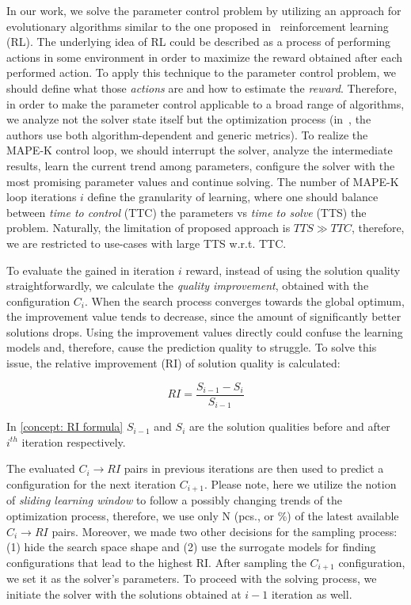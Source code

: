 In our work, we solve the parameter control problem by utilizing an approach for evolutionary algorithms similar to the one proposed in~\cite{karafotias2014generic} reinforcement learning (RL). The underlying idea of RL could be described as a process of performing actions in some environment in order to maximize the reward obtained after each performed action. To apply this technique to the parameter control problem, we should define what those \emph{actions} are and how to estimate the \emph{reward}. Therefore, in order to make the parameter control applicable to a broad range of algorithms, we analyze not the solver state itself but the optimization process (in~\cite{karafotias2014generic}, the authors use both algorithm-dependent and generic metrics). To realize the MAPE-K control loop, we should interrupt the solver, analyze the intermediate results, learn the current trend among parameters, configure the solver with the most promising parameter values and continue solving. The number of MAPE-K loop iterations $i$ define the granularity of learning, where one should balance between \emph{time to control} (TTC) the parameters vs \emph{time to solve} (TTS) the problem. Naturally, the limitation of proposed approach is $TTS \gg TTC$, therefore, we are restricted to use-cases with large TTS w.r.t. TTC.

To evaluate the gained in iteration $i$ reward, instead of using the solution quality straightforwardly, we calculate the \emph{quality improvement}, obtained with the configuration $C_i$. When the search process converges towards the global optimum, the improvement value tends to decrease, since the amount of significantly better solutions drops. Using the improvement values directly could confuse the learning models and, therefore, cause the prediction quality to struggle. To solve this issue, the relative improvement (RI) of solution quality is calculated: 

\begin{equation}
RI = \frac{S_{i-1} - S_{i}}{S_{i-1}}
\label{concept: RI formula}
\end{equation}

In \cref{concept: RI formula} $S_{i-1}$ and $S_i$ are the solution qualities before and after $i^{th}$ iteration respectively.

The evaluated $C_i \rightarrow RI$ pairs in previous iterations are then used to predict a configuration for the next iteration $C_{i+1}$. Please note, here we utilize the notion of \emph{sliding learning window} to follow a possibly changing trends of the optimization process, therefore, we use only N (pcs., or \%) of the latest available $C_i \rightarrow RI$ pairs. Moreover, we made two other decisions for the sampling process: (1) hide the search space shape and (2) use the surrogate models for finding configurations that lead to the highest RI. After sampling the $C_{i+1}$ configuration, we set it as the solver's parameters. To proceed with the solving process, we initiate the solver with the solutions obtained at $i-1$ iteration as well.

